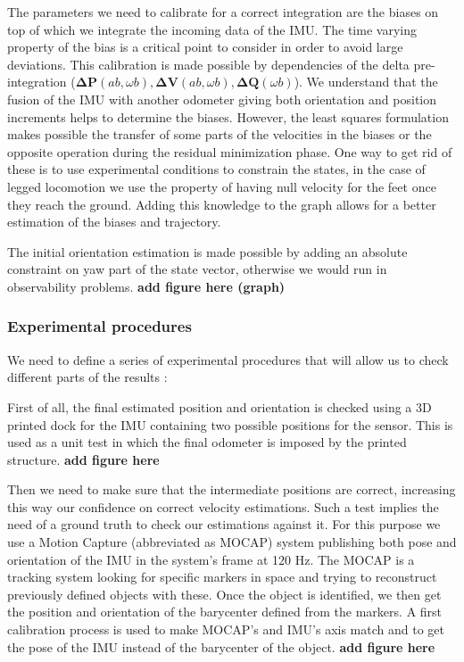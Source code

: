 The parameters we need to calibrate for a correct integration are the biases on top of which we integrate the incoming data of the IMU.
The time varying property of the bias is a critical point to consider in order to avoid large deviations. This calibration is made possible
by dependencies of the delta pre-integration ($\boldsymbol{\Delta P}(ab, \omega b), \boldsymbol{\Delta V}(ab, \omega b), \boldsymbol{\Delta Q}(\omega b)$). We understand that the fusion of the IMU with another odometer giving both
orientation and position increments helps to determine the biases. However, the least squares formulation makes possible the transfer of some parts
of the velocities in the biases or the opposite operation during the residual minimization phase. One way to get rid of these is to use experimental conditions to constrain the states, in the case of legged
locomotion we use the property of having null velocity for the feet once they reach the ground. Adding this knowledge to the graph allows for a
better estimation of the biases and trajectory.

The initial orientation estimation is made possible by adding an absolute constraint on yaw part of the state vector, otherwise we would run in observability problems. \textbf{add figure here (graph)}

\subsubsection{Experimental procedures}

We need to define a series of experimental procedures that will allow us to check different parts of the results :

First of all, the final estimated position and orientation is checked using a 3D printed dock for the IMU containing two possible positions for the sensor.
This is used as a unit test in which the final odometer is imposed by the printed structure. \textbf{add figure here}

Then we need to make sure that the intermediate positions are correct, increasing this way our confidence on correct velocity estimations.
Such a test implies the need of a ground truth to check our estimations against it. For this purpose we use a Motion Capture (abbreviated as MOCAP) system publishing both
pose and orientation of the IMU in the system's frame at 120 Hz. The MOCAP is a tracking system looking for specific markers in space
and trying to reconstruct previously defined objects with these. Once the object is identified, we then get the position and orientation of the barycenter defined from the markers.
A first calibration process is used to make MOCAP's and IMU's axis match and to get the pose of the IMU instead of the barycenter of the object. \textbf{add figure here}

